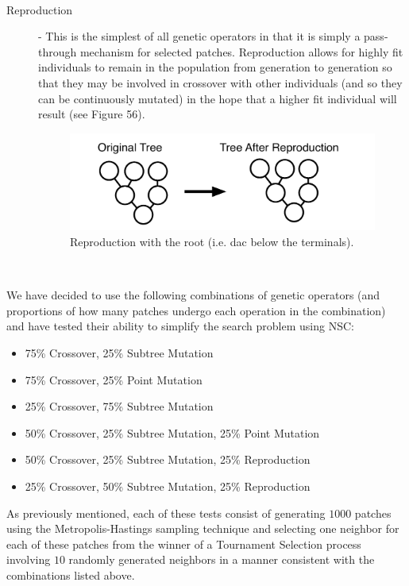 \documentclass[12pt]{report} 	%
\numberwithin{figure}{chapter}
\numberwithin{table}{chapter}
\numberwithin{equation}{chapter}
\begin{document}
\begin{flushleft}
\begin{description}
\begin{figure}[h!]
\begin{center}
\end{center}
\end{figure}
\\
\item[Reproduction] - This is the simplest of all genetic operators in that it is simply a pass-through mechanism for selected patches. Reproduction allows for highly fit individuals to remain in the population from generation to generation so that they may be involved in crossover with other individuals (and so they can be continuously mutated) in the hope that a higher fit individual will result (see Figure 56).
\begin{figure}[h!]
\begin{center}
\includegraphics[scale=0.5]{Reproduction}
\caption[Reproduction]{Reproduction with the root (i.e. dac\texttildelow{} below the terminals).}
\end{center}
\end{figure}
\\
\end{description}

We have decided to use the following combinations of genetic operators (and proportions of how many patches undergo each operation in the combination) and have tested their ability to simplify the search problem using NSC:

\begin{itemize}
\item 75\% Crossover, 25\% Subtree Mutation
\item 75\% Crossover, 25\% Point Mutation
\item 25\% Crossover, 75\% Subtree Mutation
\item 50\% Crossover, 25\% Subtree Mutation, 25\% Point Mutation
\item 50\% Crossover, 25\% Subtree Mutation, 25\% Reproduction
\item 25\% Crossover, 50\% Subtree Mutation, 25\% Reproduction
\end{itemize}
As previously mentioned, each of these tests consist of generating $1000$ patches using the Metropolis-Hastings sampling technique and selecting one neighbor for each of these patches from the winner of a Tournament Selection process involving $10$ randomly generated neighbors in a manner consistent with the combinations listed above.


\end{flushleft}
\end{document}
